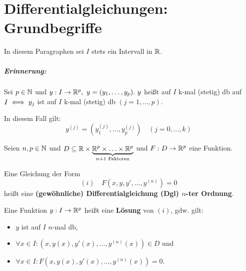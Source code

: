 \documentclass[a4paper,twoside,DIV15,BCOR12mm]{scrbook}
\begin{document}
\chapter{Differentialgleichungen: Grundbegriffe}

In diesem Paragraphen sei $I$ stets ein Intervall in $\mathbb{R}$.

\paragraph{Erinnerung:}
Sei $p\in\mathbb{N}$ und $y:I\to \mathbb{R}^p,\ y=(y_1,\ldots,y_p).\ y$ heißt auf $I$ k-mal (stetig) db auf $I \iff y_j$ ist auf $I$ k-mal (stetig) db $(j=1,\ldots,p).$

In diesem Fall gilt: $$y^{(j)} = (y_1^{(j)},\ldots,y_p^{(j)})\quad(j=0,\ldots,k)$$

\begin{definition}
Seien $n,p\in\mathbb{N}$ und $D\subseteq\mathbb{R}\times\underbrace{\mathbb{R}^p\times\ldots\times\mathbb{R}^p}_{n+1\text{ Faktoren}}$ und $F:D\to\mathbb{R}^p$ eine Funktion.

Eine Gleichung der Form $$(i)\quad F(x,y,y',\ldots,y^{(n)})=0$$ heißt eine \textbf{(gewöhnliche) Differentialgleichung (Dgl) $n$-ter Ordnung}.


Eine Funktion $y:I\to\mathbb{R}^p$ heißt eine \textbf{Lösung} von $(i)$, gdw. gilt:
\begin{itemize}
\item $y$ ist auf $I$ $n$-mal db,
\item $\forall x\in I: (x,y(x),y'(x),\ldots,y^{(n)}(x))\in D$ und
\item $\forall x\in I: F(x,y(x),y'(x),\ldots,y^{(n)}(x)) = 0.$
\end{itemize}
\end{definition}
\end{document}
